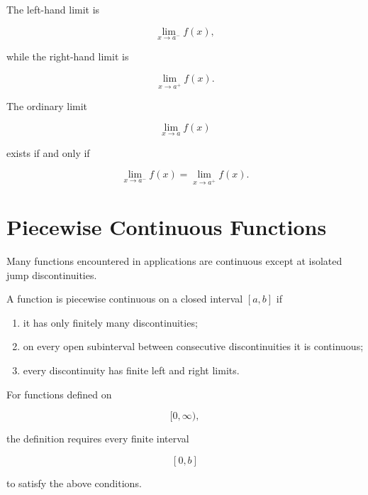 \documentclass{essay}
\begin{document}
\begin{definition}

The left-hand limit is

\[
\lim_{x\to a^-}f(x),
\]

while the right-hand limit is

\[
\lim_{x\to a^+}f(x).
\]

\end{definition}

\begin{theorem}

The ordinary limit

\[
\lim_{x\to a}f(x)
\]

exists if and only if

\[
\lim_{x\to a^-}f(x)
=
\lim_{x\to a^+}f(x).
\]

\end{theorem}


\section{Piecewise Continuous Functions}

Many functions encountered in applications are continuous except at isolated
jump discontinuities.

\begin{definition}

A function is piecewise continuous on a closed interval \([a,b]\) if

\begin{enumerate}
\item it has only finitely many discontinuities;

\item on every open subinterval between consecutive discontinuities it is
continuous;

\item every discontinuity has finite left and right limits.

\end{enumerate}

\end{definition}

For functions defined on

\[
[0,\infty),
\]

the definition requires every finite interval

\[
[0,b]
\]

to satisfy the above conditions.
\end{document}
